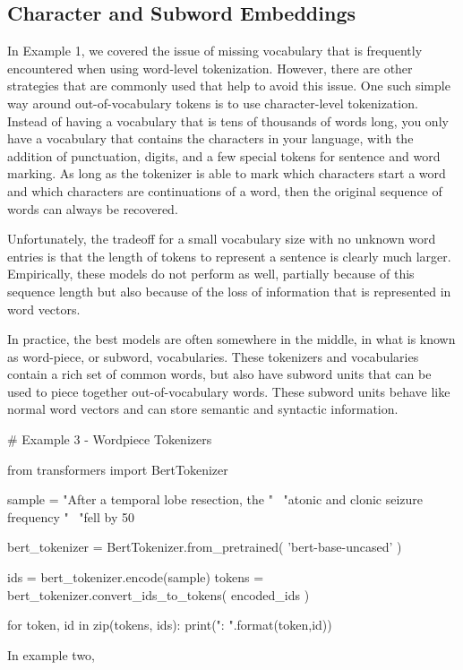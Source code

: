 \subsection{Character and Subword Embeddings}

In Example 1, we covered the issue of missing vocabulary that is frequently encountered when using word-level tokenization.
However, there are other strategies that are commonly used that help to avoid this issue.
One such simple way around out-of-vocabulary tokens is to use character-level tokenization.
Instead of having a vocabulary that is tens of thousands of words long, you only have a vocabulary that contains the characters in
your language, with the addition of punctuation, digits, and a few special tokens for sentence and word marking.
As long as the tokenizer is able to mark which characters start a word and which characters are continuations of a word, then the original sequence of words can always be recovered.

Unfortunately, the tradeoff for a small vocabulary size with no unknown word entries is that the length of tokens to represent a sentence is clearly much larger.
Empirically, these models do not perform as well, partially because of this sequence length but also because of the loss of information that is represented in word vectors.

In practice, the best models are often somewhere in the middle, in what is known as word-piece, or subword, vocabularies.
These tokenizers and vocabularies contain a rich set of common words, but also have subword units that can be used to piece together out-of-vocabulary words.
These subword units behave like normal word vectors and can store semantic and syntactic information.


\begin{python}
  # Example 3 - Wordpiece Tokenizers

  from transformers import BertTokenizer

  sample = "After a temporal lobe resection, the " \
           "atonic and clonic seizure frequency " \
           "fell by 50%

  bert_tokenizer = BertTokenizer.from_pretrained(
      'bert-base-uncased'
  )

  ids = bert_tokenizer.encode(sample)
  tokens = bert_tokenizer.convert_ids_to_tokens(
      encoded_ids
  )

  for token, id  in zip(tokens, ids):
      print("{}: {}".format(token,id))
\end{python}

In example two,
